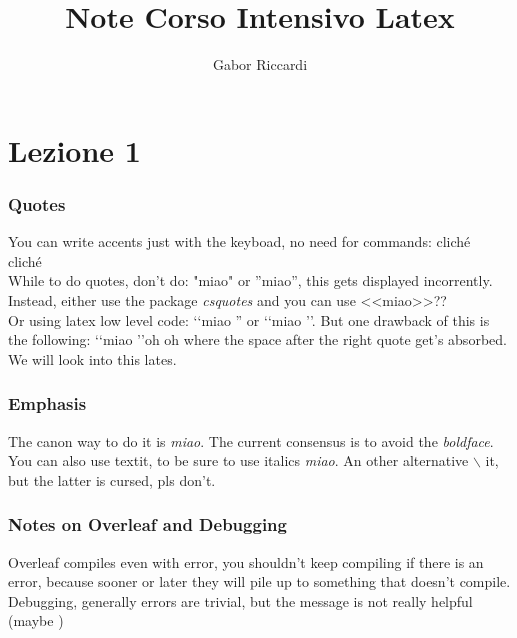 \documentclass[]{report}
\title{Note Corso Intensivo Latex}
\author{Gabor Riccardi}
\begin{document}
\maketitle
\chapter{Lezione 1}
\subsection{Quotes}
You can write accents just with the keyboad, no need for commands:
cliché \\
clich\'e \\
While to do quotes, don't do: "miao" or ''miao'', this gets displayed incorrently.
Instead, either use the package \emph{csquotes} and you can use <<miao>>?? \\ 
Or using latex low level code: \lq\lq miao '' or \lq\lq miao \rq \rq. But one drawback of this is the following: \lq\lq miao \rq \rq oh oh where the space after the right quote get's absorbed. We will look into this lates.
\subsection{Emphasis}
    The canon way to do it is \emph{miao}. The current consensus is to avoid the \emph{boldface}.
    You can also use textit, to be sure to use italics \textit{miao}. An other alternative \(\backslash\) it, but the latter is cursed, pls don't.
    
\subsection{Notes on Overleaf and Debugging}
    Overleaf compiles even with error, you shouldn't keep compiling if there is an error, because sooner or later they will pile up to something that doesn't compile.
    \\ Debugging, generally errors are trivial, but the message is not really helpful (maybe )
\end{document}
